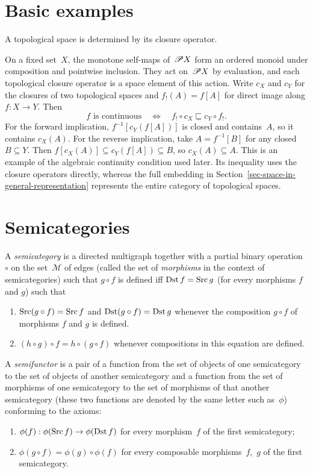 \chapter{Basic examples}

A topological space is determined by its closure operator.

On a fixed set~$X$, the monotone self-maps of~$\mathscr{P} X$ form an ordered
monoid under composition and pointwise inclusion. They act on~$\mathscr{P} X$
by evaluation, and each topological closure operator is a space element of
this action. Write $c_X$ and $c_Y$ for the closures of two topological
spaces and $f_!(A)=f[A]$ for direct image along $f:X\to Y$. Then
\[
 f\text{ is continuous}\quad\Longleftrightarrow\quad
 f_!\circ c_X\sqsubseteq c_Y\circ f_!.
\]
For the forward implication, $f^{-1}[c_Y(f[A])]$ is closed and contains~$A$,
so it contains $c_X(A)$. For the reverse implication, take $A=f^{-1}[B]$
for any closed $B\subseteq Y$. Then $f[c_X(A)]\subseteq c_Y(f[A])\subseteq B$,
so $c_X(A)\subseteq A$. This is an example of the algebraic continuity
condition used later. Its inequality uses the closure operators directly,
whereas the full embedding in Section~\ref{sec-space-in-general-representation}
represents the entire category of topological spaces.

\chapter{Semicategories}

\begin{defn}
A \emph{semicategory} is a directed multigraph
together with a partial binary operation $\circ$ on the set~$\mathcal{M}$ of edges (called the set of \emph{morphisms} in the context of semicategories)
such that $g\circ f$ is defined iff $\operatorname{Dst} f=\operatorname{Src} g$ (for every morphisms
$f$ and $g$) such that
\begin{enumerate}
\item $\operatorname{Src}(g\circ f)=\operatorname{Src} f$ and $\operatorname{Dst}(g\circ f)=\operatorname{Dst} g$ whenever the
composition $g\circ f$ of morphisms $f$ and $g$ is defined.
\item $(h\circ g)\circ f=h\circ(g\circ f)$ whenever compositions in this
equation are defined.
\end{enumerate}
\end{defn}

\begin{defn}
A \emph{semifunctor} is a pair of a function from the set of objects of one semicategory to the set of objects of another semicategory and a function from the set of morphisms of one semicategory to the set of morphisms of that another semicategory (these two functions are denoted by the same letter such as~$\phi$) conforming to the axioms:
\begin{enumerate}
\item $\phi(f): \phi(\operatorname{Src} f)\to\phi(\operatorname{Dst} f)$ for every morphism~$f$ of the first semicategory;
\item $\phi(g\circ f)=\phi(g)\circ\phi(f)$ for every composable morphisms~$f$,~$g$ of the first semicategory.
\end{enumerate}
\end{defn}

